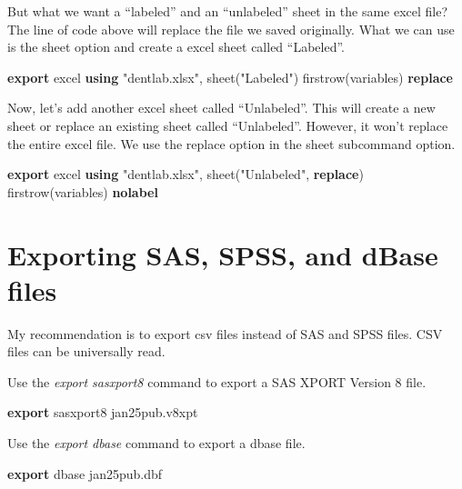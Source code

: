 \documentclass[
]{book}
\newenvironment{Shaded}{\begin{snugshade}}{\end{snugshade}}
\newcommand{\KeywordTok}[1]{\textcolor[rgb]{0.13,0.29,0.53}{\textbf{#1}}}
\newcommand{\NormalTok}[1]{#1}
\newcommand{\StringTok}[1]{\textcolor[rgb]{0.31,0.60,0.02}{#1}}
\begin{document}
But what we want a ``labeled'' and an ``unlabeled'' sheet in the same excel file?
The line of code above will replace the file we saved originally. What we can use is the sheet option and create a excel sheet called ``Labeled''.

\begin{Shaded}
\begin{Highlighting}[]
    \KeywordTok{export}\NormalTok{ excel }\KeywordTok{using} \StringTok{"dentlab.xlsx"}\NormalTok{, sheet(}\StringTok{"Labeled"}\NormalTok{) firstrow(variables) }\KeywordTok{replace}
\end{Highlighting}
\end{Shaded}

Now, let's add another excel sheet called ``Unlabeled''. This will create a new sheet or replace an existing sheet called ``Unlabeled''. However, it won't replace the entire excel file. We use the replace option in the sheet subcommand option.

\begin{Shaded}
\begin{Highlighting}[]
\KeywordTok{export}\NormalTok{ excel }\KeywordTok{using} \StringTok{"dentlab.xlsx"}\NormalTok{, sheet(}\StringTok{"Unlabeled"}\NormalTok{, }\KeywordTok{replace}\NormalTok{) firstrow(variables) }\KeywordTok{nolabel}
\end{Highlighting}
\end{Shaded}

\section{Exporting SAS, SPSS, and dBase files}\label{exporting-sas-spss-and-dbase-files}

My recommendation is to export csv files instead of SAS and SPSS files. CSV files can be universally read.

Use the \emph{export sasxport8} command to export a SAS XPORT Version 8 file.

\begin{Shaded}
\begin{Highlighting}[]
\KeywordTok{export}\NormalTok{ sasxport8 jan25pub.v8xpt}
\end{Highlighting}
\end{Shaded}

Use the \emph{export dbase} command to export a dbase file.

\begin{Shaded}
\begin{Highlighting}[]
\KeywordTok{export}\NormalTok{ dbase jan25pub.dbf}
\end{Highlighting}
\end{Shaded}
\end{document}
